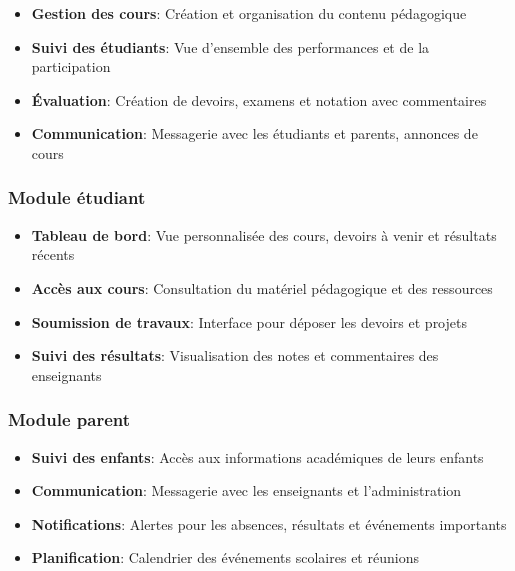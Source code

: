 \begin{itemize}
  \item \textbf{Gestion des cours}: Création et organisation du contenu pédagogique
  
  \item \textbf{Suivi des étudiants}: Vue d'ensemble des performances et de la participation
  
  \item \textbf{Évaluation}: Création de devoirs, examens et notation avec commentaires
  
  \item \textbf{Communication}: Messagerie avec les étudiants et parents, annonces de cours
\end{itemize}

\subsubsection{Module étudiant}

\begin{itemize}
  \item \textbf{Tableau de bord}: Vue personnalisée des cours, devoirs à venir et résultats récents
  
  \item \textbf{Accès aux cours}: Consultation du matériel pédagogique et des ressources
  
  \item \textbf{Soumission de travaux}: Interface pour déposer les devoirs et projets
  
  \item \textbf{Suivi des résultats}: Visualisation des notes et commentaires des enseignants
\end{itemize}

\subsubsection{Module parent}

\begin{itemize}
  \item \textbf{Suivi des enfants}: Accès aux informations académiques de leurs enfants
  
  \item \textbf{Communication}: Messagerie avec les enseignants et l'administration
  
  \item \textbf{Notifications}: Alertes pour les absences, résultats et événements importants
  
  \item \textbf{Planification}: Calendrier des événements scolaires et réunions
\end{itemize}

